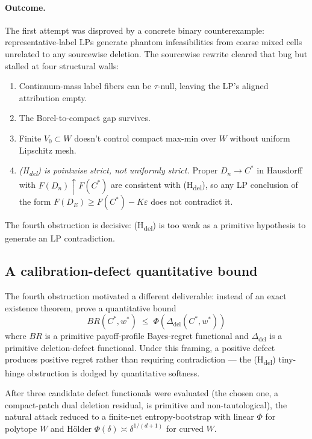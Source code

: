 \documentclass[11pt]{article}
\theoremstyle{definition}
\theoremstyle{remark}
\newcommand{\eps}{\varepsilon}
\begin{document}
\paragraph{Outcome.} The first attempt was disproved by a concrete
binary counterexample: representative-label LPs generate phantom
infeasibilities from coarse mixed cells unrelated to any sourcewise
deletion. The sourcewise rewrite cleared that bug but stalled at
four structural walls:
\begin{enumerate}[leftmargin=2em]
\item Continuum-mass label fibers can be $\tau$-null, leaving the
LP's aligned attribution empty.
\item The Borel-to-compact gap survives.
\item Finite $V_0 \subset W$ doesn't control compact max-min over
$W$ without uniform Lipschitz mesh.
\item \emph{(H\textsubscript{del}) is pointwise strict, not
uniformly strict.} Proper $D_n \to C^*$ in Hausdorff with
$F(D_n) \uparrow F(C^*)$ are consistent with (H\textsubscript{del}),
so any LP conclusion of the form $F(D_E) \ge F(C^*) - K\eps$ does
not contradict it.
\end{enumerate}

The fourth obstruction is decisive: (H\textsubscript{del}) is too
weak as a primitive hypothesis to generate an LP contradiction.

\subsection{A calibration-defect quantitative bound}\label{sec:defect}

The fourth obstruction motivated a different deliverable: instead
of an exact existence theorem, prove a quantitative bound
\[
  BR(C^*, w^*) \;\le\; \Phi(\Delta_\text{del}(C^*, w^*))
\]
where $BR$ is a primitive payoff-profile Bayes-regret functional and
$\Delta_\text{del}$ is a primitive deletion-defect functional. Under
this framing, a positive defect produces positive regret rather than
requiring contradiction --- the (H\textsubscript{del})
tiny-hinge obstruction is dodged by quantitative softness.

After three candidate defect functionals were evaluated (the chosen
one, a compact-patch dual deletion residual, is primitive and
non-tautological), the natural attack reduced to a finite-net
entropy-bootstrap with linear $\Phi$ for polytope $W$ and Hölder
$\Phi(\delta) \asymp \delta^{1/(d+1)}$ for curved $W$.
\end{document}
